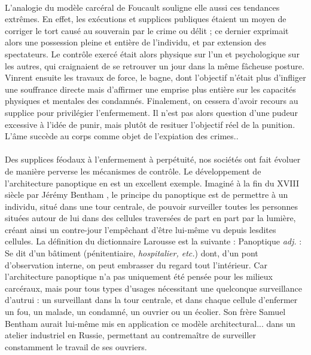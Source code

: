 \paragraph{} L'analogie du modèle carcéral de Foucault souligne elle aussi ces tendances extrêmes.
En effet, les exécutions et supplices publiques étaient un moyen de corriger le tort causé au souverain par le crime ou
délit ; ce dernier exprimait alors une possession pleine et entière de l'individu, et par extension des spectateurs. 
Le contrôle exercé était alors physique sur l'un et psychologique sur les autres, qui craignaient de se retrouver un jour
dans la même fâcheuse posture. Vinrent ensuite les travaux de force, le bagne, dont l'objectif n'était plus d'infliger
une souffrance directe mais d'affirmer une emprise plus entière sur les capacités physiques et mentales des condamnés.
Finalement, on cessera d'avoir recours au supplice pour privilégier l'enfermement. Il n'est pas alors question d'une
pudeur excessive à l'idée de punir, mais plutôt de resituer l'objectif réel de la punition.
\guillemotleft L'âme succède au corps comme objet de l'expiation des crimes.\guillemotright  \cite{Foucault0}.

\paragraph{} Des supplices féodaux à l'enfermement à perpétuité, nos sociétés ont fait évoluer de manière perverse les
mécanismes de contrôle. Le développement de l'architecture panoptique en est un excellent exemple. Imaginé à la fin du
XVIII siècle par Jérémy Bentham \cite{Panoptique1}, le principe du panoptique est de permettre à un individu,
situé dans une tour centrale, de pouvoir surveiller toutes les personnes situées autour de lui dans des cellules traversées
de part en part par la lumière, créant ainsi un contre-jour l'empêchant d'être lui-même vu depuis lesdites cellules.
La définition du dictionnaire Larousse est la suivante : \guillemotleft Panoptique \emph{adj.} : Se dit d'un bâtiment (pénitentiaire,
\emph{hospitalier, etc.}) dont, d'un pont d'observation interne, on peut embrasser du regard tout l'intérieur.\guillemotright
\cite{Panoptique0} Car l'architecture panoptique n'a pas uniquement été pensée pour les milieux carcéraux, mais pour tous
types d'usages nécessitant une quelconque surveillance d'autrui : \guillemotleft [...] un surveillant dans la
tour centrale, et dans chaque cellule d'enfermer un fou, un malade, un condamné, un ouvrier ou un écolier.\guillemotright
\cite{Panoptique2} Son frère Samuel Bentham aurait lui-même mis en application ce modèle architectural... dans un atelier
industriel en Russie, permettant au contremaître de surveiller constamment le travail de ses ouvriers.

